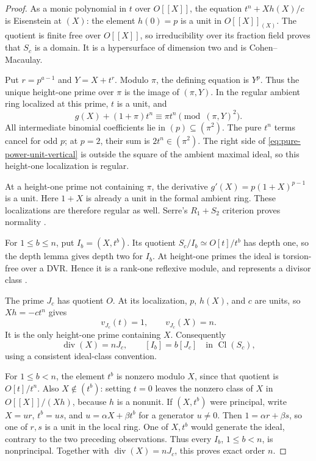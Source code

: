 \begin{proof}
As a monic polynomial in \(t\) over \(O[[X]]\), the equation
\(t^n+Xh(X)/c\) is Eisenstein at \((X)\): the element \(h(0)=p\)
is a unit in \(O[[X]]_{(X)}\).  The quotient is finite free over
\(O[[X]]\), so irreducibility over its fraction field proves that
\(S_c\) is a domain.  It is a hypersurface of dimension two and
is Cohen--Macaulay.

Put \(r=p^{a-1}\) and \(Y=X+t^r\).  Modulo \(\pi\), the defining
equation is \(Y^p\).  Thus the unique height-one prime over
\(\pi\) is the image of \((\pi,Y)\).  In the regular ambient
ring localized at this prime, \(t\) is a unit, and
\begin{equation}\label{eq:pure-power-unit-vertical}
 g(X)+(1+\pi)t^n\equiv\pi t^n\pmod{(\pi,Y)^2}.
\end{equation}
All intermediate binomial coefficients lie in \((p)\subseteq
(\pi^2)\).  The pure \(t^n\) terms cancel for odd \(p\); at
\(p=2\), their sum is \(2t^n\in(\pi^2)\).
The right side of \eqref{eq:pure-power-unit-vertical} is outside
the square of the ambient maximal ideal, so this height-one
localization is regular.

At a height-one prime not containing \(\pi\), the derivative
\(g'(X)=p(1+X)^{p-1}\) is a unit.  Here \(1+X\) is already a
unit in the formal ambient ring.  These localizations are therefore
regular as well.  Serre's \(R_1+S_2\) criterion proves normality
\citep[Tag 031S]{Stacks2026}.

For \(1\le b\le n\), put \(I_b=(X,t^b)\).
Its quotient \(S_c/I_b\simeq O[t]/t^b\) has depth one, so the
depth lemma gives depth two for \(I_b\).  At height-one primes
the ideal is torsion-free over a DVR.  Hence it is a rank-one
reflexive module, and represents a divisor class
\citep[Tags 0AVB and 0EBM]{Stacks2026}.

The prime \(J_c\) has quotient \(O\).  At its localization,
\(p\), \(h(X)\), and \(c\) are units, so \(Xh=-ct^n\) gives
\[
 v_{J_c}(t)=1,\qquad v_{J_c}(X)=n.
\]
It is the only height-one prime containing \(X\).  Consequently
\[
 \operatorname{div}(X)=nJ_c,\qquad
 [I_b]=b[J_c]\quad\text{in }\operatorname{Cl}(S_c),
\]
using a consistent ideal-class convention.

For \(1\le b<n\), the element \(t^b\) is nonzero modulo \(X\),
since that quotient is \(O[t]/t^n\).  Also \(X\notin(t^b)\):
setting \(t=0\) leaves the nonzero class of \(X\) in
\(O[[X]]/(Xh)\), because \(h\) is a nonunit.
If \((X,t^b)\) were principal, write \(X=ur\), \(t^b=us\),
and \(u=\alpha X+\beta t^b\) for a generator \(u\ne0\).
Then \(1=\alpha r+\beta s\), so one of \(r,s\) is a unit in
the local ring.  One of \(X,t^b\) would generate the ideal,
contrary to the two preceding observations.  Thus every \(I_b\),
\(1\le b<n\), is nonprincipal.  Together with
\(\operatorname{div}(X)=nJ_c\), this proves exact order \(n\).
\end{proof}

